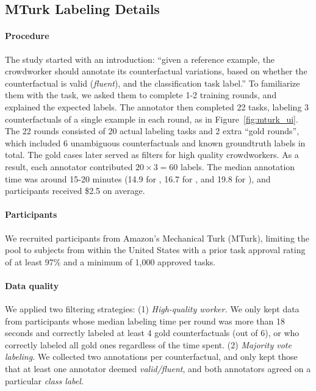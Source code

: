 \subsection{MTurk Labeling Details}
\label{appendix:label_instruct}


\paragraph{Procedure}
The study started with an introduction: 
``given a reference example, the crowdworker should annotate its counterfactual variations, based on whether the counterfactual is valid (\emph{fluent}), and the classification task label.''
To familiarize them with the task, we asked them to complete 1-2 training rounds, and explained the expected labels.
The annotator then completed 22 tasks, labeling 3 counterfactuals of a single example in each round, as in Figure~\ref{fig:mturk_ui}.
The 22 rounds consisted of 20 actual labeling tasks and 2 extra ``gold rounds'', which included 6 unambiguous counterfactuals and known groundtruth labels in total.
The gold cases later served as filters for high quality crowdworkers.
As a result, each annotator contributed $20 \times 3=60$ labels.
The median annotation time was around 15-20 minutes (14.9 for \qqp, 16.7 for \sst, and 19.8 for \nli), and participants received \$2.5 on average.

\paragraph{Participants}
We recruited participants from Amazon's Mechanical Turk (MTurk), limiting the pool to subjects from within the United States with a prior task approval rating of at least 97\% and a minimum of 1,000 approved tasks.

\paragraph{Data quality}
We applied two filtering strategies: 
(1) \emph{High-quality worker.} 
We only kept data from participants whose median labeling time per round was more than 18 seconds and correctly labeled at least 4 gold counterfactuals (out of 6), or who correctly labeled all gold ones regardless of the time spent.
(2) \emph{Majority vote labeling.}
We collected two annotations per counterfactual, and only kept those that at least one annotator deemed \emph{valid/fluent}, and both annotators agreed on a particular \emph{class label.}

